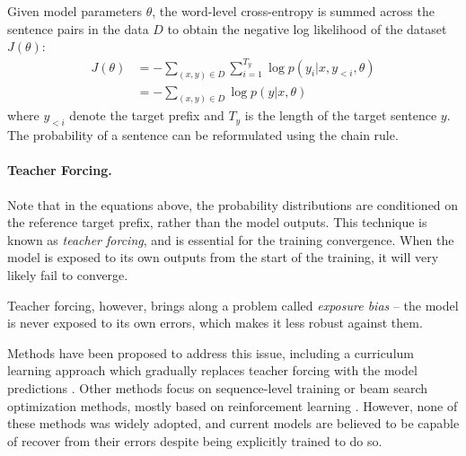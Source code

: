 Given model parameters $\theta$, the word-level cross-entropy is summed across
the sentence pairs in the data $D$ to obtain the negative log likelihood of the
dataset $J(\theta)$:
%
\begin{equation}
  \begin{split}
  J(\theta) &= - \sum_{(x, y) \in D} \sum_{i = 1}^{T_y} \log p(y_i | x, y_{<i}, \theta) \\
  &= - \sum_{(x, y) \in D} \log p(y | x, \theta)
  \end{split} \label{eq:loss}
\end{equation}
%
where $y_{<i}$ denote the target prefix and $T_{y}$ is the length of the target
sentence $y$. The probability of a sentence can be reformulated using the chain
rule.




\paragraph{Teacher Forcing.}
Note that in the equations above, the probability distributions are conditioned
on the reference target prefix, rather than the model outputs. This technique
is known as \emph{teacher forcing}, and is essential for the training
convergence. When the model is exposed to its own outputs from the start of the
training, it will very likely fail to converge.

Teacher forcing, however, brings along a problem called \emph{exposure bias} --
the model is never exposed to its own errors, which makes it less robust
against them.

Methods have been proposed to address this issue, including a curriculum
learning approach which gradually replaces teacher forcing with the model
predictions \citep{bengio2015scheduled}. Other methods focus on sequence-level
training or beam search optimization methods, mostly based on reinforcement
learning \citep{williams1992simple, wiseman-rush-2016-sequence,
  ranzato2016sequence}. However, none of these methods was widely adopted, and
current models are believed to be capable of recover from their errors despite
being explicitly trained to do so.

